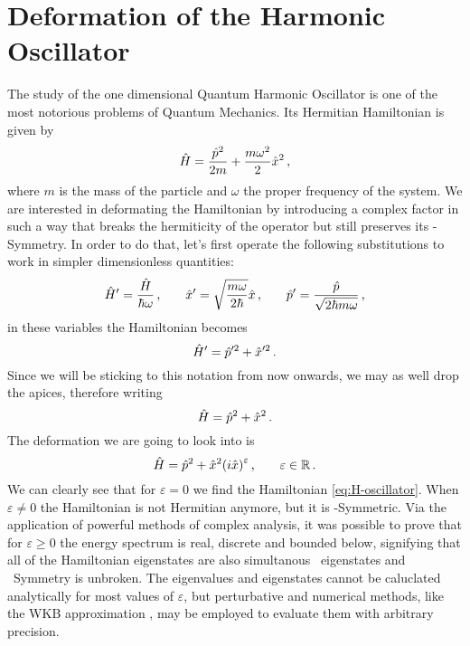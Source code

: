         \section{Deformation of the Harmonic Oscillator}
            The study of the one dimensional Quantum Harmonic Oscillator is one of the most notorious problems of Quantum Mechanics. Its Hermitian Hamiltonian is given by
            \begin{equation}
                \hat{H} = \frac{\hat{p}^2}{2m} + \frac{m\omega^2}{2}\hat{x}^2\,\text{,}
            \end{equation}
            where $m$ is the mass of the particle and $\omega$ the proper frequency of the system. We are interested in deformating the Hamiltonian by introducing a complex factor in such a way that breaks the hermiticity of the operator but still preserves its \PT-Symmetry. In order to do that, let's first operate the following substitutions to work in simpler dimensionless quantities:
            \begin{equation}
                \hat{H}' = \frac{\hat{H}}{\hbar\omega}
                \,\text{,}\qquad
                \hat{x}' = \sqrt{\frac{m\omega}{2\hbar}}\hat{x}
                \,\text{,}\qquad
                \hat{p}' = \frac{\hat{p}}{\sqrt{2 \hbar m \omega}}
                \,\text{,}
            \end{equation}
            in these variables the Hamiltonian becomes
            \begin{equation*}
                \hat{H}' = \hat{p}'^2 + \hat{x}'^2
                \,\text{.}
            \end{equation*}
            Since we will be sticking to this notation from now onwards, we may as well drop the apices, therefore writing
            \begin{equation}
                \label{eq:H-oscillator}
                \hat{H} = \hat{p}^2 + \hat{x}^2
                \,\text{.}
            \end{equation}
            The deformation we are going to look into is
            \begin{equation}
                \hH = \hp^2 + \hx^2\pqty{i\hx}^\varepsilon
                \mycomma\qquad
                \varepsilon \in \bbR
                \myperiod
            \end{equation}
            We can clearly see that for $\varepsilon = 0$ we find the Hamiltonian \eqref{eq:H-oscillator}. When $\varepsilon \neq 0$ the Hamiltonian is not Hermitian anymore, but it is \PT-Symmetric. Via the application of powerful methods of complex analysis, it was possible to prove that for $\varepsilon \geq 0$ the energy spectrum is real, discrete and bounded below, signifying that all of the Hamiltonian eigenstates are also simultanous \hPT\ eigenstates and \PT\ Symmetry is unbroken. The eigenvalues and eigenstates cannot be caluclated analytically for most values of $\varepsilon$, but perturbative and numerical methods, like the WKB approximation \cite{Bender2007}, may be employed to evaluate them with arbitrary precision.

